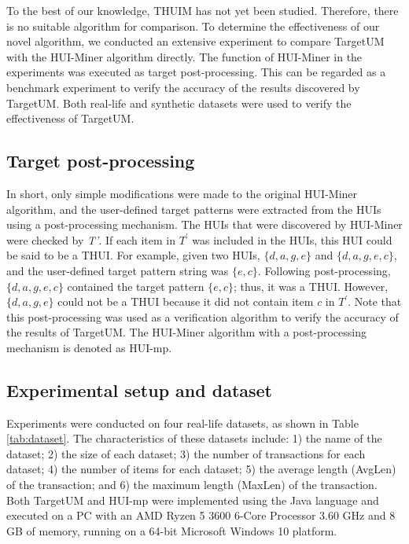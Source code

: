 \documentclass[journal]{IEEEtran}
\begin{document}
To the best of our knowledge, THUIM has not yet been studied. Therefore, there is no suitable algorithm for comparison. To determine the effectiveness of our novel algorithm, we conducted an extensive experiment to compare TargetUM with the HUI-Miner algorithm \cite{liu2012mining} directly. The function of HUI-Miner in the experiments was executed as target post-processing. This can be regarded as a benchmark experiment to verify the accuracy of the results discovered by TargetUM. Both real-life and synthetic datasets were used to verify the effectiveness of TargetUM.

\subsection{Target post-processing}
\label{sec:target_post_processing}

In short, only simple modifications were made to the original HUI-Miner algorithm, and the user-defined target patterns were extracted from the HUIs using a post-processing mechanism. The HUIs that were discovered by HUI-Miner were checked by \textit{T'}. If each item in \textit{$T^\prime$} was included in the HUIs, this HUI could be said to be a THUI. For example, given two HUIs, $\{d, a, g, e\}$ and $\{d, a, g, e, c\}$, and the user-defined target pattern string was $\{e, c\}$. Following post-processing, $\{d, a, g, e, c\}$ contained the target pattern $\{e, c\}$; thus, it was a THUI. However, $\{d, a, g, e\}$ could not be a THUI because it did not contain item $c$ in \textit{$T^\prime$}. Note that this post-processing was used as a verification algorithm to verify the accuracy of the results of TargetUM. The HUI-Miner algorithm with a post-processing mechanism is denoted as HUI-mp.

\subsection{Experimental setup and dataset}

Experiments were conducted on four real-life datasets, as shown in Table \ref{tab:dataset}. The characteristics of these datasets include: 1) the name of the dataset; 2) the size of each dataset; 3) the number of transactions for each dataset; 4) the number of items for each dataset; 5) the average length (AvgLen) of the transaction; and 6) the maximum length (MaxLen) of the transaction. Both TargetUM and HUI-mp were implemented using the Java language and executed on a PC with an AMD Ryzen 5 3600 6-Core Processor 3.60 GHz and 8 GB of memory, running on a 64-bit Microsoft Windows 10 platform.
\end{document}
